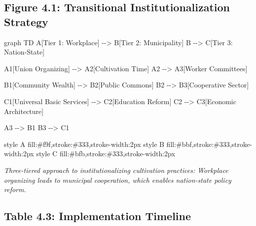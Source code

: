 \documentclass[
  a4paper,
]{report}
\newenvironment{Shaded}{\begin{snugshade}}{\end{snugshade}}
\newcommand{\NormalTok}[1]{\textcolor[rgb]{0.00,0.23,0.31}{#1}}
\begin{document}
\subsection{Figure 4.1: Transitional Institutionalization
Strategy}\label{figure-4.1-transitional-institutionalization-strategy}

\begin{Shaded}
\begin{Highlighting}[]
\NormalTok{graph TD}
\NormalTok{    A[Tier 1: Workplace] {-}{-}\textgreater{} B[Tier 2: Municipality]}
\NormalTok{    B {-}{-}\textgreater{} C[Tier 3: Nation{-}State]}
    
\NormalTok{    A1[Union Organizing] {-}{-}\textgreater{} A2[Cultivation Time]}
\NormalTok{    A2 {-}{-}\textgreater{} A3[Worker Committees]}
    
\NormalTok{    B1[Community Wealth] {-}{-}\textgreater{} B2[Public Commons]}
\NormalTok{    B2 {-}{-}\textgreater{} B3[Cooperative Sector]}
    
\NormalTok{    C1[Universal Basic Services] {-}{-}\textgreater{} C2[Education Reform]}
\NormalTok{    C2 {-}{-}\textgreater{} C3[Economic Architecture]}
    
\NormalTok{    A3 {-}{-}\textgreater{} B1}
\NormalTok{    B3 {-}{-}\textgreater{} C1}
    
\NormalTok{    style A fill:\#f9f,stroke:\#333,stroke{-}width:2px}
\NormalTok{    style B fill:\#bbf,stroke:\#333,stroke{-}width:2px}
\NormalTok{    style C fill:\#bfb,stroke:\#333,stroke{-}width:2px}
\end{Highlighting}
\end{Shaded}

\emph{Three-tiered approach to institutionalizing cultivation practices:
Workplace organizing leads to municipal cooperation, which enables
nation-state policy reform.}

\subsection{Table 4.3: Implementation
Timeline}\label{table-4.3-implementation-timeline}
\end{document}
